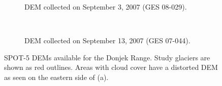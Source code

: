 \documentclass[12pt]{article}
\begin{document}
\begin{figure}[H]
    \centering
    \begin{subfigure}[b]{0.48\textwidth}
        \caption{DEM collected on September 3, 2007 (GES 08-029).}
        \label{fig:8029_original}
    \end{subfigure}
    ~
    \begin{subfigure}[b]{0.48\textwidth}
        \caption{DEM collected on September 13, 2007 (GES 07-044).}
        \label{fig:7044_original}
    \end{subfigure}

    \caption{SPOT-5 DEMs available for the Donjek Range. Study glaciers are shown as red outlines. Areas with cloud cover have a distorted DEM as seen on the eastern side of (a).}
    \label{photo_swe}
\end{figure}
\end{document}
